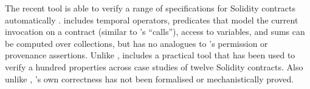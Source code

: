 The recent {} tool is able to verify a range of
specifications for Solidity contracts automatically \cite{VerX}.
{} includes  temporal operators, predicates that
model the current invocation on a contract (similar to \Nec's
``calls''), access to variables, 
and sums can be computed over collections,
but has no analogues to \Nec's permission or provenance assertions.
%
%
Unlike \Nec, {} includes a practical tool that has
been used to verify a hundred properties across case studies of
twelve Solidity contracts. Also unlike \Nec, {}'s own correctness
has not been formalised or mechanistically proved. 








